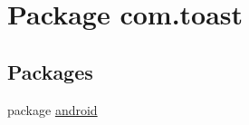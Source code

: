 \hypertarget{namespacecom_1_1toast}{}\section{Package com.\+toast}
\label{namespacecom_1_1toast}
\subsection*{Packages}
\begin{DoxyCompactItemize}
\item 
package \hyperlink{namespacecom_1_1toast_1_1android}{android}
\end{DoxyCompactItemize}
